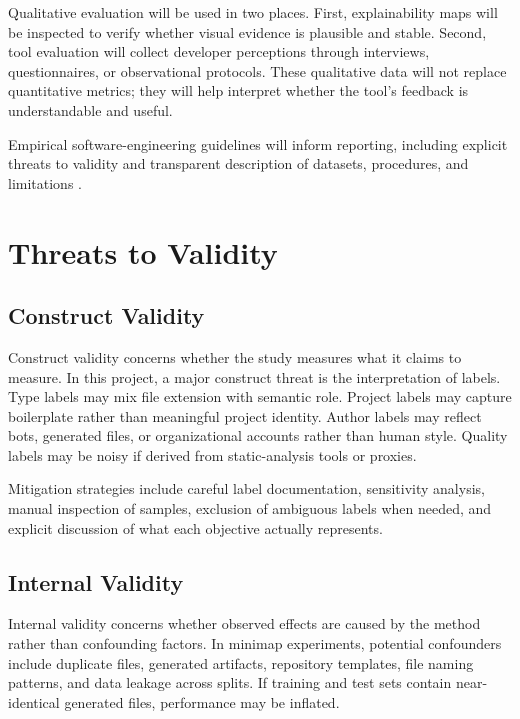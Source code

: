 Qualitative evaluation will be used in two places. First, explainability maps
will be inspected to verify whether visual evidence is plausible and stable.
Second, tool evaluation will collect developer perceptions through interviews,
questionnaires, or observational protocols. These qualitative data will not
replace quantitative metrics; they will help interpret whether the tool's
feedback is understandable and useful.

Empirical software-engineering guidelines will inform reporting, including
explicit threats to validity and transparent description of datasets, procedures,
and limitations \cite{kitchenham2002preliminary,wohlin2012experimentation,runeson2012case}.

\section{Threats to Validity}

\subsection{Construct Validity}

Construct validity concerns whether the study measures what it claims to
measure. In this project, a major construct threat is the interpretation of
labels. Type labels may mix file extension with semantic role. Project labels
may capture boilerplate rather than meaningful project identity. Author labels
may reflect bots, generated files, or organizational accounts rather than human
style. Quality labels may be noisy if derived from static-analysis tools or
proxies.

Mitigation strategies include careful label documentation, sensitivity analysis,
manual inspection of samples, exclusion of ambiguous labels when needed, and
explicit discussion of what each objective actually represents.

\subsection{Internal Validity}

Internal validity concerns whether observed effects are caused by the method
rather than confounding factors. In minimap experiments, potential confounders
include duplicate files, generated artifacts, repository templates, file naming
patterns, and data leakage across splits. If training and test sets contain
near-identical generated files, performance may be inflated.

